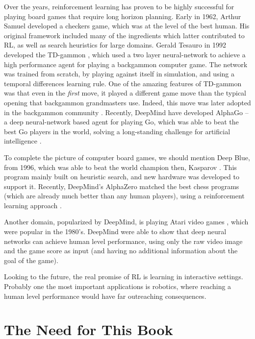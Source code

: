 Over the years, reinforcement learning has proven to be highly
successful for playing board games that require long horizon planning. 
Early in 1962, Arthur Samuel \cite{Samuel62} developed a checkers game, which was at
the level of the best human. His original framework included many of
the ingredients which latter contributed to RL,
as well as search heuristics for large domains.
Gerald
Tesauro in 1992 developed the TD-gammon \cite{Tesauro95}, which used a two layer
neural-network to achieve a high performance agent for playing a backgammon computer
game. The network was trained from scratch, by playing against itself in simulation, and using a temporal differences learning rule. One of the amazing features
of TD-gammon was that even in the {\em first} move, it played a
different game move than the typical opening that backgammon grandmasters use. Indeed, this move was later adopted in the backgammon community \cite{Tesauro02}.
Recently, DeepMind have developed AlphaGo -- a deep neural-network based agent
for playing Go, which was able to beat the best Go players in the world, solving a long-standing challenge for artificial intelligence \cite{silver2016mastering}. 

To complete the picture of computer board games, we should mention
Deep Blue, from 1996, which was able to beat the world champion then,
Kasparov \cite{DeepBlue}. This program mainly built on heuristic search, and new hardware was developed to support it. Recently, DeepMind's
AlphaZero matched the best chess
programs (which are already much better than any human players), using a reinforcement learning approach \cite{silver2017mastering}.

Another domain, popularized by DeepMind, is playing Atari video
games \cite{mnih2015human}, which were popular in the 1980's. DeepMind were able to
show that deep neural networks can achieve human level performance,
using only the raw video image and the game score as input (and having no additional
information about the goal of the game). 

Looking to the future, the real promise of RL
is learning in interactive settings. Probably one the most important
applications is robotics, where reaching a human level performance
would have far outreaching consequences.

\section{The Need for This Book}

